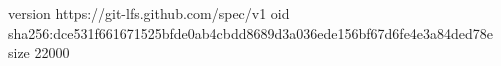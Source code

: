 version https://git-lfs.github.com/spec/v1
oid sha256:dce531f661671525bfde0ab4cbdd8689d3a036ede156bf67d6fe4e3a84ded78e
size 22000
